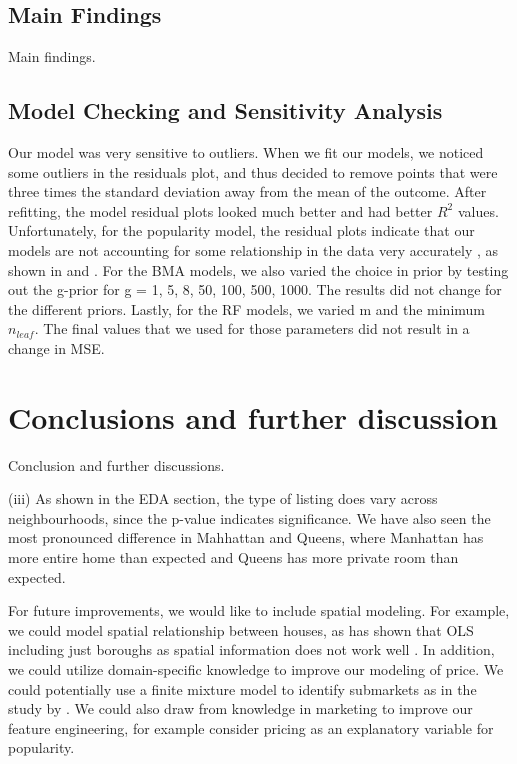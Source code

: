 \documentclass[10pt]{jmlr}%
\begin{document}
\subsection{Main Findings}
Main findings.

\subsection{Model Checking and Sensitivity Analysis}
Our model was very sensitive to outliers. When we fit our models, we noticed some outliers in the residuals plot, and thus decided to remove points that were three times the standard deviation away from the mean of the outcome. After refitting, the model residual plots looked much better and had better $R^2$ values. Unfortunately, for the popularity model, the residual plots indicate that our models are not accounting for some relationship in the data very accurately , as shown in  and . For the BMA models, we also varied the choice in prior by testing out the g-prior for g = 1, 5, 8, 50, 100, 500, 1000. The results did not change for the different priors. Lastly, for the RF models, we varied m and the minimum $n_{leaf}$. The final values that we used for those parameters did not result in a change in MSE. 

\section{Conclusions and further discussion}
\label{sec:conclusion}
Conclusion and further discussions.

(iii) As shown in the EDA section, the type of listing does vary across neighbourhoods, since the p-value indicates significance. We have also seen the most pronounced difference in Mahhattan and Queens, where Manhattan has more entire home than expected and Queens has more private room than expected.

For future improvements, we would like to include spatial modeling. For example, we could model spatial relationship between houses, as \cite{james2005apartment} has shown that OLS including just boroughs as spatial information does not work well . In addition, we could utilize domain-specific knowledge to improve our modeling of price. We could potentially use a finite mixture model to identify submarkets as in the study by \cite{belasco2012using}. We could also draw from knowledge in marketing to improve our feature engineering, for example consider pricing as an explanatory variable for popularity.
\end{document}
